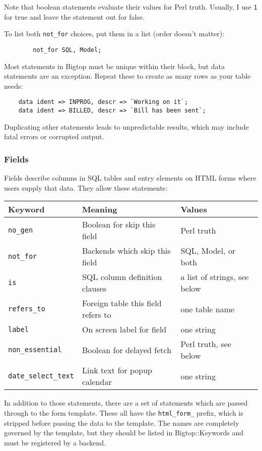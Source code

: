 Note that boolean statements evaluate their values for Perl truth.  Usually,
I use \verb+1+ for true and leave the statement out for false.

To list both \verb+not_for+ choices, put them in a list (order doesn't matter):

\begin{verbatim}
        not_for SQL, Model;
\end{verbatim}

Most statements in Bigtop must be unique within their block, but data
statements are an exception.  Repeat these to create as many rows as your
table needs:

\begin{verbatim}
    data ident => INPROG, descr => `Working on it`;
    data ident => BILLED, descr => `Bill has been sent`;
\end{verbatim}

Duplicating other statements leads to unpredictable results, which may
include fatal errors or corrupted output.

\subsubsection*{Fields}

Fields describe columns in SQL tables and entry elements on HTML forms
where users supply that data.  They allow these statements:

\begin{tabular}{l|l|l}
Keyword & Meaning & Values \\
\hline
\verb+no_gen+  & Boolean for skip this field & Perl truth \\
\verb+not_for+ & Backends which skip this field & SQL, Model, or both \\
\verb+is+ & SQL column definition clauses & a list of strings, see below \\
\verb+refers_to+ & Foreign table this field refers to & one table name \\
\verb+label+ & On screen label for field & one string \\
\verb+non_essential+ & Boolean for delayed fetch & Perl truth, see below \\
\verb+date_select_text+ & Link text for popup calendar & one string \\
\end{tabular}

In addition to those statements, there are a set of statements which are
passed through to the form template.  These all have the \verb+html_form_+
prefix, which is stripped before passing the data to the template.  The
names are completely governed by the template, but they should be listed
in Bigtop::Keywords and must be registered by a backend.

